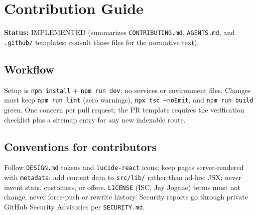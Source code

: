 \section{Contribution Guide}
\label{sec:contribution-guide}

\textbf{Status:} IMPLEMENTED (summarizes \texttt{CONTRIBUTING.md}, \texttt{AGENTS.md}, and \texttt{.github/} templates; consult those files for the normative text).

\subsection{Workflow}
Setup is \texttt{npm install} + \texttt{npm run dev}; no services or environment files. Changes must keep \texttt{npm run lint} (zero warnings), \texttt{npx tsc --noEmit}, and \texttt{npm run build} green. One concern per pull request; the PR template requires the verification checklist plus a sitemap entry for any new indexable route.

\subsection{Conventions for contributors}
Follow \texttt{DESIGN.md} tokens and \texttt{lucide-react} icons; keep pages server-rendered with \texttt{metadata}; add content data to \texttt{src/lib/} rather than ad-hoc JSX; never invent stats, customers, or offers. \texttt{LICENSE} (ISC, Jay Jogane) terms must not change; never force-push or rewrite history. Security reports go through private GitHub Security Advisories per \texttt{SECURITY.md}.
